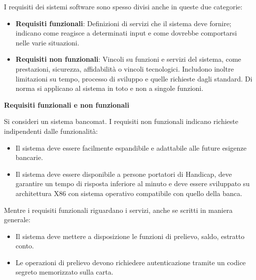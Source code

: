 \noindent I requisiti dei sistemi software sono spesso divisi anche in queste due categorie: \begin{itemize}
	\item \textbf{Requisiti funzionali}: Definizioni di servizi che il sistema deve fornire; indicano come reagisce a determinati input e come dovrebbe comportarsi nelle varie situazioni.
	\item \textbf{Requisiti non funzionali}: Vincoli su funzioni e servizi del sistema, come prestazioni, sicurezza, affidabilità o vincoli tecnologici. Includono inoltre limitazioni su tempo, processo di sviluppo e quelle richieste dagli standard. Di norma si applicano al sistema in toto e non a singole funzioni.
\end{itemize}
\begin{esempio}
	\textbf{Requisiti funzionali e non funzionali}\par
	\noindent Si consideri un sistema bancomat. I requisiti non funzionali indicano richieste indipendenti dalle funzionalità: \begin{itemize}
		\item Il sistema deve essere facilmente espandibile e adattabile alle future esigenze bancarie.
		\item Il sistema deve essere disponibile a persone portatori di Handicap, deve garantire un tempo di risposta inferiore al minuto e deve essere sviluppato su architettura X86 con sistema	operativo compatibile con quello della banca.
	\end{itemize}
	\noindent Mentre i requisiti funzionali riguardano i servizi, anche se scritti in maniera generale: \begin{itemize}
		\item Il sistema deve mettere a disposizione le funzioni di prelievo, saldo, estratto conto.
		\item Le operazioni di prelievo devono richiedere autenticazione tramite un codice segreto memorizzato sulla carta.
	\end{itemize}
\end{esempio}



%

